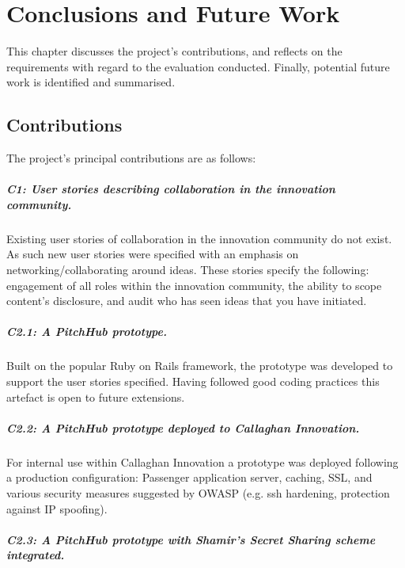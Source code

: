 \chapter{Conclusions and Future Work}
This chapter discusses the project's contributions, and reflects on the requirements with regard to the evaluation conducted. Finally, potential future work is identified and summarised.

\section{Contributions}
The project's principal contributions are as follows:

\paragraph{C1: User stories describing collaboration in the innovation community.} 

Existing user stories of collaboration in the innovation community do not exist. As such new user stories were specified with an emphasis on networking/collaborating around ideas. These stories specify the following: engagement of all roles within the innovation community, the ability to scope content's disclosure, and audit who has seen ideas that you have initiated.

\paragraph{C2.1: A PitchHub prototype.} 

Built on the popular Ruby on Rails framework, the prototype was developed to support the user stories specified. Having followed good coding practices this artefact is open to future extensions.

\paragraph{C2.2: A PitchHub prototype deployed to Callaghan Innovation.} 

For internal use within Callaghan Innovation a prototype was deployed following a production configuration: Passenger application server, caching, SSL, and various security measures suggested by OWASP (e.g. ssh hardening, protection against IP spoofing).


\paragraph{C2.3: A PitchHub prototype with Shamir's Secret Sharing scheme integrated.} 

